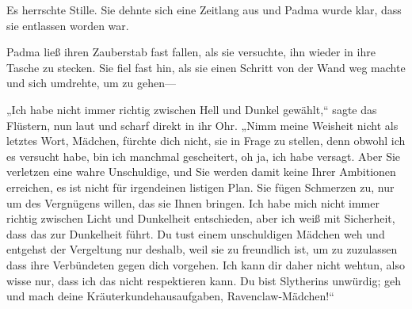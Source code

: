 Es herrschte Stille. Sie dehnte sich eine Zeitlang aus und Padma wurde klar, dass sie entlassen worden war.

Padma ließ ihren Zauberstab fast fallen, als sie versuchte, ihn wieder in ihre Tasche zu stecken. Sie fiel fast hin, als sie einen Schritt von der Wand weg machte und sich umdrehte, um zu gehen—

„Ich habe nicht immer richtig zwischen Hell und Dunkel gewählt,“ sagte das Flüstern, nun laut und scharf direkt in ihr Ohr. „Nimm meine Weisheit nicht als letztes Wort, Mädchen, fürchte dich nicht, sie in Frage zu stellen, denn obwohl ich es versucht habe, bin ich manchmal gescheitert, oh ja, ich habe versagt. Aber Sie verletzen eine wahre Unschuldige, und Sie werden damit keine Ihrer Ambitionen erreichen, es ist nicht für irgendeinen listigen Plan. Sie fügen Schmerzen zu, nur um des Vergnügens willen, das sie Ihnen bringen. Ich habe mich nicht immer richtig zwischen Licht und Dunkelheit entschieden, aber ich weiß mit Sicherheit, dass das zur Dunkelheit führt. Du tust einem unschuldigen Mädchen weh und entgehst der Vergeltung nur deshalb, weil sie zu freundlich ist, um zu zuzulassen dass ihre Verbündeten gegen dich vorgehen. Ich kann dir daher nicht wehtun, also wisse nur, dass ich das nicht respektieren kann. Du bist Slytherins unwürdig; geh und mach deine Kräuterkundehausaufgaben, Ravenclaw-Mädchen!“

